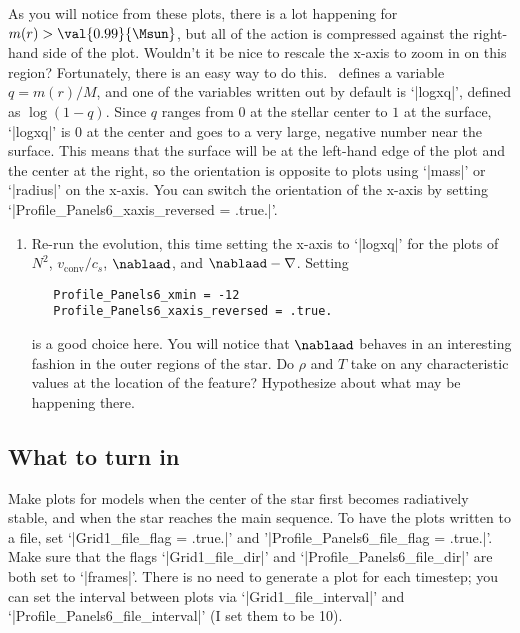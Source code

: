 \begin{mesaproject}
As you will notice from these plots, there is a lot happening for $m(r) > \val{0.99}{\Msun}$, but all of the action is compressed against the right-hand side of the plot.  Wouldn't it be nice to rescale the x-axis to zoom in on this region?  Fortunately, there is an easy way to do this.  \mesa\ defines a variable $q = m(r)/M$, and one of the variables written out by default is `|logxq|', defined as $\log(1-q)$. Since $q$ ranges from $0$ at the stellar center to $1$ at the surface, `|logxq|' is $0$ at the center and goes to a very large, negative number near the surface. This means that the surface will be at the left-hand edge of the plot and the center at the right, so the orientation is opposite to plots using `|mass|' or `|radius|' on the x-axis.  You can switch the orientation of the x-axis by setting `|Profile_Panels6_xaxis_reversed = .true.|'.

\begin{exercisebox}
\begin{enumerate}
\item Re-run the evolution, this time setting the x-axis to `|logxq|' for the plots of $N^{2}$, $v_{\mathrm{conv}}/c_{s}$, $\nablaad$, and $\nablaad-\nabla$.  Setting
\begin{Verbatim}
   Profile_Panels6_xmin = -12
   Profile_Panels6_xaxis_reversed = .true.
\end{Verbatim}
is a good choice here. You will notice that $\nablaad$ behaves in an interesting fashion in the outer regions of the star.  Do $\rho$ and $T$ take on any characteristic values at the location of the feature?  Hypothesize about what may be happening there.
\end{enumerate}
\end{exercisebox}

\subsection{What to turn in}
Make plots for models when the center of the star first becomes radiatively stable, and when the star reaches the main sequence.  To have the plots written to a file, set
`|Grid1_file_flag = .true.|' and '|Profile_Panels6_file_flag = .true.|'.  Make sure that the flags `|Grid1_file_dir|' and `|Profile_Panels6_file_dir|' are both set to `|frames|'.  There is no need to generate a plot for each timestep; you can set the interval between plots via `|Grid1_file_interval|' and `|Profile_Panels6_file_interval|' (I set them to be 10).

\end{mesaproject}

\UndefineShortVerb{\|}
